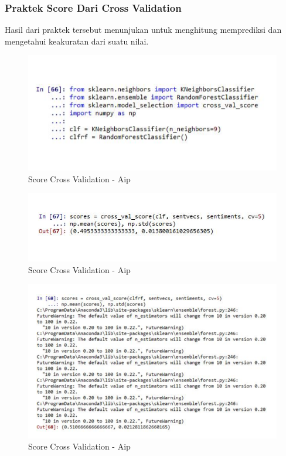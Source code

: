 \subsubsection{Praktek Score Dari Cross Validation}
Hasil dari praktek tersebut menunjukan untuk menghitung memprediksi dan mengetahui keakuratan dari suatu nilai.
\begin{figure}[!hbtp]
\centering
\includegraphics[scale=0.3]{figures/AIP/e31.PNG}
\caption{Score Cross Validation - Aip}
\label{Score Cross Validation - Aip}
\end{figure}

\begin{figure}[!hbtp]
\centering
\includegraphics[scale=0.3]{figures/AIP/e32.PNG}
\caption{Score Cross Validation - Aip}
\label{Score Cross Validation - Aip}
\end{figure}

\begin{figure}[!hbtp]
\centering
\includegraphics[scale=0.3]{figures/AIP/e33.PNG}
\caption{Score Cross Validation - Aip}
\label{Score Cross Validation - Aip}
\end{figure}

